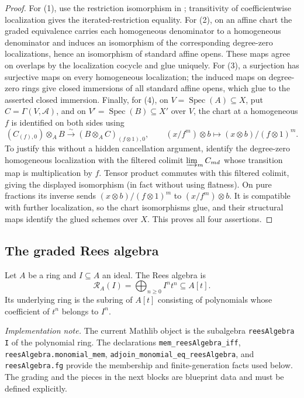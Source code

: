 \begin{proof}
  For (1), use the restriction isomorphism in
  ; transitivity of coefficientwise
  localization gives the iterated-restriction equality.  For (2), on an affine
  chart the graded equivalence carries each homogeneous denominator to a
  homogeneous denominator and induces an isomorphism of the corresponding
  degree-zero localizations, hence an isomorphism of standard affine opens.
  These maps agree on overlaps by the localization cocycle and glue uniquely.
  For (3), a surjection has surjective maps on every homogeneous localization;
  the induced maps on degree-zero rings give closed immersions of all standard
  affine opens, which glue to the asserted closed immersion.  Finally, for
  (4), on $V=\operatorname{Spec}(A)\subseteq X$, put
  $C=\Gamma(V,\mathcal A)$, and on
  $V'=\operatorname{Spec}(B)\subseteq X'$ over $V$, the chart at a
  homogeneous $f$ is identified on both sides using
  \[
    (C_{(f),0})\otimes_A B
      \xrightarrow{\sim}(B\otimes_A C)_{(f\otimes1),0},
    \qquad (x/f^m)\otimes b\longmapsto (x\otimes b)/(f\otimes1)^m .
  \]
  To justify this without a hidden cancellation argument, identify the
  degree-zero homogeneous localization with the filtered colimit
  $\varinjlim_m C_{md}$ whose transition map is multiplication by $f$.
  Tensor product commutes with this filtered colimit, giving the displayed
  isomorphism (in fact without using flatness).  On pure fractions its inverse
  sends $(x\otimes b)/(f\otimes1)^m$ to $(x/f^m)\otimes b$.  It is compatible
  with further localization, so the chart isomorphisms glue, and their
  structural maps identify the glued schemes over $X$.  This proves all four
  assertions.
\end{proof}

\subsection{The graded Rees algebra}

\begin{definition}
  \label{def:nagata-rees-algebra}

  Let $A$ be a ring and $I\subseteq A$ an ideal.  The Rees algebra is
  \[
    \mathcal R_A(I)=\bigoplus_{n\geq 0}I^nt^n\subseteq A[t].
  \]
  Its underlying ring is the subring of $A[t]$ consisting of polynomials whose
  coefficient of $t^n$ belongs to $I^n$.

  \emph{Implementation note.}  The current Mathlib object is the subalgebra
  \texttt{reesAlgebra I} of the polynomial ring.  The declarations
  \texttt{mem\_reesAlgebra\_iff}, \texttt{reesAlgebra.monomial\_mem},
  \texttt{adjoin\_monomial\_eq\_reesAlgebra}, and
  \texttt{reesAlgebra.fg} provide the membership and finite-generation facts
  used below.  The grading and the pieces in the next blocks are blueprint
  data and must be defined explicitly.
\end{definition}

